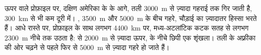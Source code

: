 \begin{example}[दक्षिण अटलांटिक के आर-पार]
ऊपर वाले प्रोफ़ाइल पर, दक्षिण अमेरिका के  के आगे, तली \qty{3000}{m} से ज़्यादा
गहराई तक गिर जाती है, \qty{300}{km} से भी कम दूरी में। , \qty{3500}{m} और \qty{5000}{m} के बीच गहरे, चौड़ाई का ज़्यादातर
हिस्सा भरते हैं। आधे रास्ते पर, प्रोफ़ाइल के साथ लगभग \qty{4400}{km} पर, मध्य-अटलांटिक
कटक सतह से लगभग \qty{2300}{m} नीचे तक उठता है:  से \qty{2000}{m} से ज़्यादा
ऊपर,  के नीचे छिपी एक  शृंखला। तली के अफ़्रीका की ओर चढ़ने से पहले  फिर
से \qty{5000}{m} से ज़्यादा गहरे हो जाते हैं।
\end{example}

